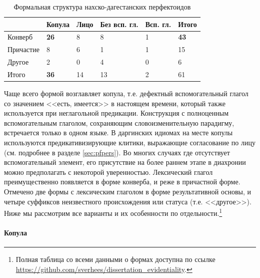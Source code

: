 \begin{table}[ht]
\caption{Формальная структура нахско-дагестанских перфектоидов}
\label{tab:pform}
\vspace{0.2cm}
\begin{center}
\begin{tabular}{l|llll|l}
          & Копула      & Лицо & Без всп. гл. & Всп. гл. & Итого       \\ \hline
Конверб   & \textbf{26} & 8    & 8            & 1        & \textbf{43} \\
Причастие & 8           & 6    & 1            & 1        & 15          \\
Другое    & 2           & 0    & 4            & 0        & 6           \\ \hline
Итого     & \textbf{36} & 14   & 13           & 2        & 61         
\end{tabular}
\end{center}
\end{table}

Чаще всего формой возглавляет копула, т.е. дефектный вспомогательный глагол со значением <<есть, имеется>> в настоящем времени, который также используется при неглагольной предикации. Конструкция с полноценным вспомогательным глаголом, сохраняющим словоизменительную парадигму, встречается только в одном языке. В даргинских идиомах на месте копулы используются предикативизирующие клитики, выражающие согласование по лицу (см. подробнее в разделе \ref{sec:pfpers}). Во многих случаях где отсутствует вспомогательный элемент, его присутствие на более раннем этапе в диахронии можно предполагать с некоторой уверенностью. Лексический глагол преимущественно появляется в форме конверба, и реже в причастной форме. Отмечено две формы с лексическим глаголом в форме результативной основы, и четыре суффиксов неизвестного происхождения или статуса (т.е. <<другое>>). Ниже мы рассмотрим все варианты и их особенности по отдельности.\footnote{Полная таблица со всеми данными о формах доступна по ссылке \url{https://github.com/sverhees/dissertation_evidentiality}.}

\paragraph{Копула} \label{sec:pfcop}


